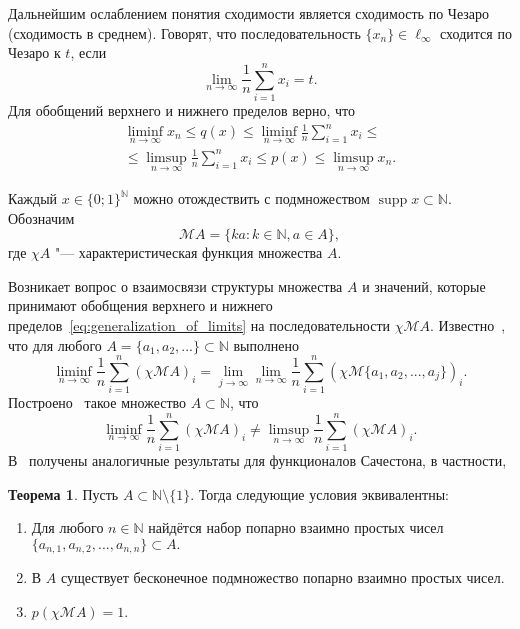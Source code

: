 \documentclass{vzmsthesis}
\theoremstyle{definition}
\newtheorem{theorem}[lemma]{Теорема}
\begin{document}
Дальнейшим ослаблением понятия сходимости является сходимость по Чезаро (сходимость в среднем).
Говорят, что последовательность $\{x_n\}\in\ell_\infty$ сходится по Чезаро к $t$, если
\begin{equation}
	\lim_{n\to\infty}\frac1{n}\sum_{i=1}^n x_i = t
	.
\end{equation}
Для обобщений верхнего и нижнего пределов верно, что
\begin{multline}
	\label{eq:generalization_of_limits}
	\liminf_{n\to\infty} x_n \leq q(x) \leq \liminf_{n\to\infty}\frac1{n}\sum_{i=1}^n x_i
	\leq
	\\ \leq
	\limsup_{n\to\infty}\frac1{n}\sum_{i=1}^n x_i
	\leq p(x)
	\leq \limsup_{n\to\infty} x_n
	.
\end{multline}


Каждый $x\in \{0;1\}^\mathbb{N}$ можно отождествить с подмножеством
$\operatorname{supp} x \subset \mathbb{N}$.
Обозначим
\begin{equation}
	\mathscr{M}A = \{ka: k\in\mathbb{N}, a\in A\}
	,
\end{equation}
где $\chi A$ "--- характеристическая функция множества $A$.

Возникает вопрос о взаимосвязи структуры множества $A$
и значений, которые принимают обобщения верхнего и нижнего пределов~\eqref{eq:generalization_of_limits}
на последовательности $\chi \mathscr{M}\!A$.
Известно~\cite{davenport1951sequences}, что для любого
$A=\{a_1,a_2,...\}\subset\mathbb{N}$
выполнено
\begin{equation*}
	\liminf_{n\to\infty}\frac1{n}\sum_{i=1}^n (\chi\mathscr{M}A)_i =
	\lim_{j\to\infty}\lim_{n\to\infty}\frac1{n}\sum_{i=1}^n (\chi\mathscr{M}\{a_1,a_2,...,a_j\})_i
	.
\end{equation*}
Построено~\cite[\S 7]{besicovitch1935density} такое множество $A\subset\mathbb{N}$, что
\begin{equation}
	\liminf_{n\to\infty}\frac1{n}\sum_{i=1}^n (\chi\mathscr{M}A)_i \neq
	\limsup_{n\to\infty}\frac1{n}\sum_{i=1}^n (\chi\mathscr{M}A)_i
	.
\end{equation}
В~\cite{avdeev2021vmzprimes} получены аналогичные результаты для функционалов Сачестона,
в частности,
\begin{theorem}
	Пусть $A\subset \mathbb{N}\setminus\{1\}$.
	Тогда следующие условия эквивалентны:
	\begin{enumerate}%
		\item
			Для любого $n\in\mathbb{N}$ найдётся набор попарно взаимно простых чисел
			$
				\{a_{n,1}, a_{n,2}, ..., a_{n,n}  \} \subset A
				.
			$
		\item
			В $A$ существует бесконечное подмножество попарно взаимно простых чисел.
		\item
			$p(\chi\mathscr{M}A)=1$.
	\end{enumerate}
\end{theorem}
\end{document}
